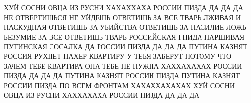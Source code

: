  
 
 
 
 

ХУЙ СОСНИ ОВЦА ИЗ РУСНИ ХАХАХХАХА РОССИИ ПИЗДА ДА ДА ДА 
НЕ ОТВЕРТИШЬСЯ НЕ УЙДЕШЬ ОТВЕТИШЬ ЗА ВСЕ ТВАРЬ ЛЖИВАЯ И ПАСКУДНАЯ
ОТВЕТИШЬ ЗА УБИЙСТВА ОТВЕТИШЬ ЗА НАСИЛИЕ ЛОЖЬ БЕЗУМИЕ 
ЗА ВСЕ ОТВЕТИШЬ ТВАРЬ РОССИЙСКАЯ ГНИДА ПАРШИВАЯ ПУТИНСКАЯ СОСАЛКА
ДА РОССИИ ПИЗДА ДА ДА ДА ПУТИНА КАЗНЯТ РОССИЯ РУХНЕТ НАХЕР
КВАРТИРУ У ТЕБЯ ЗАБЕРУТ ПОТОМУ ЧТО ЗАЧЕМ ТЕБЕ КВАРТИРА 
ОНА ТЕБЕ НЕ НУЖНА ХАХХАХАХАХ РОССИИ ПИЗДА ДА ДА ДА
ПУТИНА КАЗНЯТ РОССИИ ПИЗДА ПУТИНА КАЗНЯТ РОССИИ ПИЗДА ПО ВСЕМ ФРОНТАМ
ХАХАХХАХАХАХ ХУЙ СОСНИ ОВЦА ИЗ РУСНИ ХАХХАХАХА РОССИИ ПИЗДА ДА ДА ДА 
